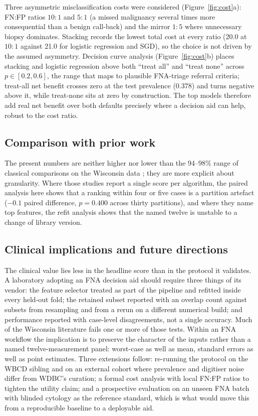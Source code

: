 \documentclass[review,12pt]{elsarticle}
\begin{document}
Three asymmetric misclassification costs were considered (Figure~\ref{fig:cost}a): FN:FP ratios $10{:}1$ and $5{:}1$ (a missed malignancy several times more consequential than a benign call-back) and the mirror $1{:}5$ where unnecessary biopsy dominates. Stacking records the lowest total cost at every ratio (20.0 at $10{:}1$ against 21.0 for logistic regression and SGD), so the choice is not driven by the assumed asymmetry. Decision curve analysis (Figure~\ref{fig:cost}b) places stacking and logistic regression above both ``treat all'' and ``treat none'' across $p \in [0.2, 0.6]$, the range that maps to plausible FNA-triage referral criteria; treat-all net benefit crosses zero at the test prevalence (0.378) and turns negative above it, while treat-none sits at zero by construction. The top models therefore add real net benefit over both defaults precisely where a decision aid can help, robust to the cost ratio.

\subsection{Comparison with prior work}

The present numbers are neither higher nor lower than the 94--98\% range of classical comparisons on the Wisconsin data \cite{salama2012experimental,lavanya2011analysis,hazra2016study,wang2018support}; they are more explicit about granularity. Where those studies report a single score per algorithm, the paired analysis here shows that a ranking within four or five cases is a partition artefact ($-0.1$ paired difference, $p=0.400$ across thirty partitions), and where they name top features, the refit analysis shows that the named twelve is unstable to a change of library version.

\subsection{Clinical implications and future directions}

The clinical value lies less in the headline score than in the protocol it validates. A laboratory adopting an FNA decision aid should require three things of its vendor: the feature selector treated as part of the pipeline and refitted inside every held-out fold; the retained subset reported with an overlap count against subsets from resampling and from a rerun on a different numerical build; and performance reported with case-level disagreements, not a single accuracy. Much of the Wisconsin literature fails one or more of those tests. Within an FNA workflow the implication is to preserve the character of the inputs rather than a named twelve-measurement panel: worst-case as well as mean, standard errors as well as point estimates. Three extensions follow: re-running the protocol on the WBCD sibling and on an external cohort where prevalence and digitiser noise differ from WDBC's curation; a formal cost analysis with local FN:FP ratios to tighten the utility claim; and a prospective evaluation on an unseen FNA batch with blinded cytology as the reference standard, which is what would move this from a reproducible baseline to a deployable aid.
\end{document}
